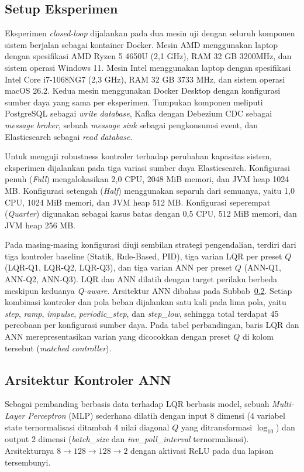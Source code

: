 \subsection{Setup Eksperimen}

Eksperimen \emph{closed-loop} dijalankan pada dua mesin uji dengan seluruh komponen
sistem berjalan sebagai kontainer Docker.
Mesin AMD menggunakan laptop dengan spesifikasi AMD Ryzen 5 4650U (2{,}1 GHz), RAM 32 GB 3200MHz,
dan sistem operasi Windows 11.
Mesin Intel menggunakan laptop dengan spesifikasi Intel Core i7-1068NG7 (2{,}3 GHz),
RAM 32 GB 3733 MHz, dan sistem operasi macOS 26.2.
Kedua mesin menggunakan Docker Desktop dengan konfigurasi sumber daya yang sama per eksperimen.
Tumpukan komponen meliputi PostgreSQL sebagai \emph{write database}, Kafka dengan Debezium CDC
sebagai \emph{message broker}, sebuah \emph{message sink} sebagai pengkonsumsi event, dan
Elasticsearch sebagai \emph{read database}.

Untuk menguji robustness kontroler terhadap perubahan kapasitas sistem, eksperimen dijalankan
pada tiga variasi sumber daya Elasticsearch.
Konfigurasi penuh (\emph{Full}) mengalokasikan 2{,}0 CPU, 2048 MiB memori, dan JVM heap 1024 MB.
Konfigurasi setengah (\emph{Half}) menggunakan separuh dari semuanya, yaitu 1{,}0 CPU,
1024 MiB memori, dan JVM heap 512 MB.
Konfigurasi seperempat (\emph{Quarter}) digunakan sebagai kasus batas dengan 0{,}5 CPU,
512 MiB memori, dan JVM heap 256 MB.

Pada masing-masing konfigurasi diuji sembilan strategi pengendalian, terdiri dari tiga
kontroler baseline (Statik, Rule-Based, PID), tiga varian LQR per preset $Q$
(LQR-Q1, LQR-Q2, LQR-Q3), dan tiga varian ANN per preset $Q$ (ANN-Q1, ANN-Q2, ANN-Q3).
LQR dan ANN dilatih dengan target perilaku berbeda meskipun keduanya \emph{Q-aware}.
Arsitektur ANN dibahas pada Subbab~\ref{sec:ann-arch}.
Setiap kombinasi kontroler dan pola beban dijalankan satu kali pada lima pola, yaitu
\emph{step}, \emph{ramp}, \emph{impulse}, \emph{periodic\_step}, dan \emph{step\_low},
sehingga total terdapat 45 percobaan per konfigurasi sumber daya.
Pada tabel perbandingan, baris LQR dan ANN merepresentasikan varian yang dicocokkan dengan
preset $Q$ di kolom tersebut (\emph{matched controller}).

\subsection{Arsitektur Kontroler ANN}
\label{sec:ann-arch}

Sebagai pembanding berbasis data terhadap LQR berbasis model, sebuah \emph{Multi-Layer
Perceptron} (MLP) sederhana dilatih dengan input 8 dimensi (4 variabel state ternormalisasi
ditambah 4 nilai diagonal $Q$ yang ditransformasi $\log_{10}$) dan output 2 dimensi
(\emph{batch\_size} dan \emph{inv\_poll\_interval} ternormalisasi). Arsitekturnya
$8 \rightarrow 128 \rightarrow 128 \rightarrow 2$ dengan aktivasi ReLU pada dua lapisan
tersembunyi.

